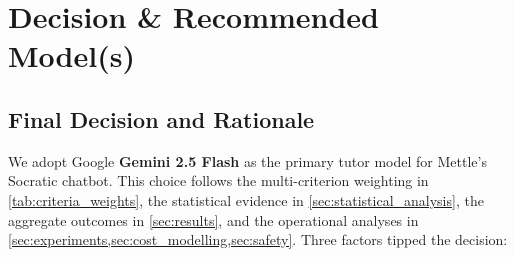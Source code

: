 \section{Decision \& Recommended Model(s)}
\label{sec:decision}

\subsection{Final Decision and Rationale}
\label{subsec:final_decision}

We adopt Google \textbf{Gemini 2.5 Flash} as the primary tutor model for Mettle's Socratic chatbot. This choice follows the multi-criterion weighting in \cref{tab:criteria_weights}, the statistical evidence in \cref{sec:statistical_analysis}, the aggregate outcomes in \cref{sec:results}, and the operational analyses in \cref{sec:experiments,sec:cost_modelling,sec:safety}. Three factors tipped the decision:

